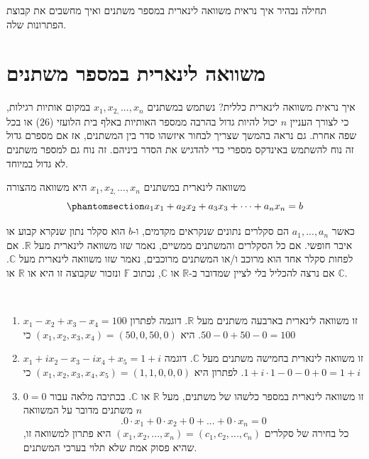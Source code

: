 \documentclass[
  hebrew,
  12pt,
  a4paper,
  oneside]{book}
\theoremstyle{definition}
\theoremstyle{remark}
\theoremstyle{plain}
\theoremstyle{remark}
\begin{document}
תחילה נבהיר איך נראית משוואה לינארית במספר משתנים ואיך מחשבים את קבוצת
הפתרונות שלה.

\section{משוואה לינארית במספר
משתנים}\label{ux5deux5e9ux5d5ux5d5ux5d0ux5d4-ux5dcux5d9ux5e0ux5d0ux5e8ux5d9ux5ea-ux5d1ux5deux5e1ux5e4ux5e8-ux5deux5e9ux5eaux5e0ux5d9ux5dd}

איך נראית משוואה לינארית כללית? נשתמש במשתנים \(x_1,x_{2,}...,x_n\)
במקום אותיות רגילות, כי לצורך העניין \(n\) יכול להיות גדול בהרבה ממספר
האותיות באלף בית הלועזי (\(26\)) או בכל שפה אחרת. גם נראה בהמשך שצריך
לבחור איזשהו סדר בין המשתנים, אז אם מספרם גדול זה נוח להשתמש באינדקס
מספרי כדי להדגיש את הסדר ביניהם. זה נוח גם למספר משתנים לא גדול במיוחד.

\begin{definition}

משוואה לינארית במשתנים \(x_1,x_{2,}...,x_n\) היא משוואה מהצורה
\begin{equation}\phantomsection\label{eq-linear-eq}{
a_1x_1 + a_2x_2 + a_3x_3 + \cdots + a_n x_n = b
}\end{equation}

כאשר \(a_1,...,a_n\) הם סקלרים נתונים שנקראים מקדמים, ו-\(b\) הוא סקלר
נתון שנקרא קבוע או איבר חופשי. אם כל הסקלרים והמשתנים ממשיים, נאמר שזו
משוואה לינארית מעל \(\mathbb R\). אם לפחות סקלר אחד הוא מרוכב ו/או
המשתנים מרוכבים, נאמר שזו משוואה לינארית מעל \(\mathbb C\). אם נרצה
להכליל בלי לציין שמדובר ב-\(\mathbb R\) או \(\mathbb C\), נכתוב
\(\mathbb F\) ונזכור שקבוצה זו היא או \(\mathbb R\) או \(\mathbb C\).

\end{definition}

\begin{example}

~

\begin{enumerate}
\def\labelenumi{\arabic{enumi}.}
\item
  \(x_1-x_2+x_3-x_4=100\) זו משוואה לינארית בארבעה משתנים מעל
  \(\mathbb R\). דוגמה לפתרון היא \((x_1,x_2,x_3,x_4)=(50,0,50,0)\) כי
  \(.50-0+50-0=100\)
\item
  \(x_1+ix_2-x_3-ix_4+x_5=1+i\) זו משוואה לינארית בחמישה משתנים מעל
  \(\mathbb C\). דוגמה לפתרון היא \((x_1,x_2,x_3,x_4,x_5)=(1,1,0,0,0)\)
  כי \(.1+i\cdot1-0-0+0=1+i\)
\item
  \(0=0\) זו משוואה לינארית במספר כלשהו של משתנים, מעל \(\mathbb R\) או
  \(\mathbb C\). בכתיבה מלאה עבור \(n\) משתנים מדובר על המשוואה
  \[.0\cdot x_1+0\cdot x_2+0+...+0\cdot x_n=0\] כל בחירה של סקלרים
  \((x_1,x_2,...,x_n)=(c_1,c_2,...,c_n)\) היא פתרון למשוואה זו, שהיא
  פסוק אמת שלא תלוי בערכי המשתנים.
\end{enumerate}

\end{example}
\end{document}
